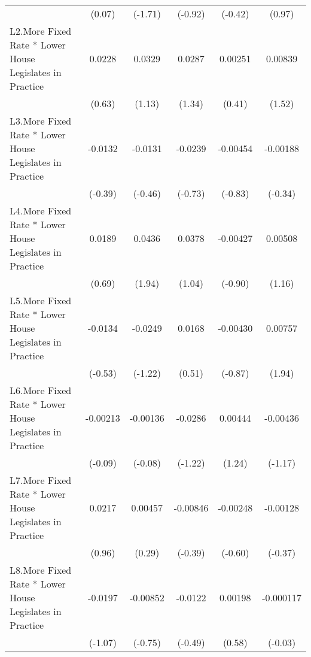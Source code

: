 {\begin{longtable}{l*{5}{c}}
                &   (0.07)         &  (-1.71)         &  (-0.92)         &  (-0.42)         &   (0.97)         \\
[1em]
L2.More Fixed Rate * Lower House Legislates in Practice&   0.0228         &   0.0329         &   0.0287         &  0.00251         &  0.00839         \\
                &   (0.63)         &   (1.13)         &   (1.34)         &   (0.41)         &   (1.52)         \\
[1em]
L3.More Fixed Rate * Lower House Legislates in Practice&  -0.0132         &  -0.0131         &  -0.0239         & -0.00454         & -0.00188         \\
                &  (-0.39)         &  (-0.46)         &  (-0.73)         &  (-0.83)         &  (-0.34)         \\
[1em]
L4.More Fixed Rate * Lower House Legislates in Practice&   0.0189         &   0.0436         &   0.0378         & -0.00427         &  0.00508         \\
                &   (0.69)         &   (1.94)         &   (1.04)         &  (-0.90)         &   (1.16)         \\
[1em]
L5.More Fixed Rate * Lower House Legislates in Practice&  -0.0134         &  -0.0249         &   0.0168         & -0.00430         &  0.00757         \\
                &  (-0.53)         &  (-1.22)         &   (0.51)         &  (-0.87)         &   (1.94)         \\
[1em]
L6.More Fixed Rate * Lower House Legislates in Practice& -0.00213         & -0.00136         &  -0.0286         &  0.00444         & -0.00436         \\
                &  (-0.09)         &  (-0.08)         &  (-1.22)         &   (1.24)         &  (-1.17)         \\
[1em]
L7.More Fixed Rate * Lower House Legislates in Practice&   0.0217         &  0.00457         & -0.00846         & -0.00248         & -0.00128         \\
                &   (0.96)         &   (0.29)         &  (-0.39)         &  (-0.60)         &  (-0.37)         \\
[1em]
L8.More Fixed Rate * Lower House Legislates in Practice&  -0.0197         & -0.00852         &  -0.0122         &  0.00198         &-0.000117         \\
                &  (-1.07)         &  (-0.75)         &  (-0.49)         &   (0.58)         &  (-0.03)         \\

\end{longtable}}
